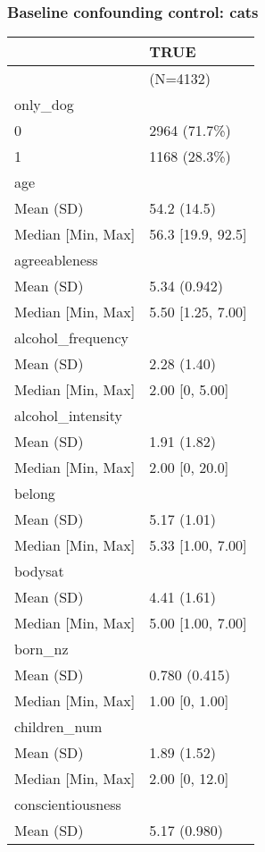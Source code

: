 \documentclass[
  singlecolumn,
  9pt]{article}
\begin{document}
\newpage{}

\subsubsection{Baseline confounding control:
cats}\label{baseline-confounding-control-cats-1}

\begin{longtable}[]{@{}ll@{}}
\toprule\noalign{}
& TRUE \\
\midrule\noalign{}
\endhead
\bottomrule\noalign{}
\endlastfoot
& (N=4132) \\
only\_dog & \\
0 & 2964 (71.7\%) \\
1 & 1168 (28.3\%) \\
age & \\
Mean (SD) & 54.2 (14.5) \\
Median {[}Min, Max{]} & 56.3 {[}19.9, 92.5{]} \\
agreeableness & \\
Mean (SD) & 5.34 (0.942) \\
Median {[}Min, Max{]} & 5.50 {[}1.25, 7.00{]} \\
alcohol\_frequency & \\
Mean (SD) & 2.28 (1.40) \\
Median {[}Min, Max{]} & 2.00 {[}0, 5.00{]} \\
alcohol\_intensity & \\
Mean (SD) & 1.91 (1.82) \\
Median {[}Min, Max{]} & 2.00 {[}0, 20.0{]} \\
belong & \\
Mean (SD) & 5.17 (1.01) \\
Median {[}Min, Max{]} & 5.33 {[}1.00, 7.00{]} \\
bodysat & \\
Mean (SD) & 4.41 (1.61) \\
Median {[}Min, Max{]} & 5.00 {[}1.00, 7.00{]} \\
born\_nz & \\
Mean (SD) & 0.780 (0.415) \\
Median {[}Min, Max{]} & 1.00 {[}0, 1.00{]} \\
children\_num & \\
Mean (SD) & 1.89 (1.52) \\
Median {[}Min, Max{]} & 2.00 {[}0, 12.0{]} \\
conscientiousness & \\
Mean (SD) & 5.17 (0.980) \\

\end{longtable}
\end{document}
